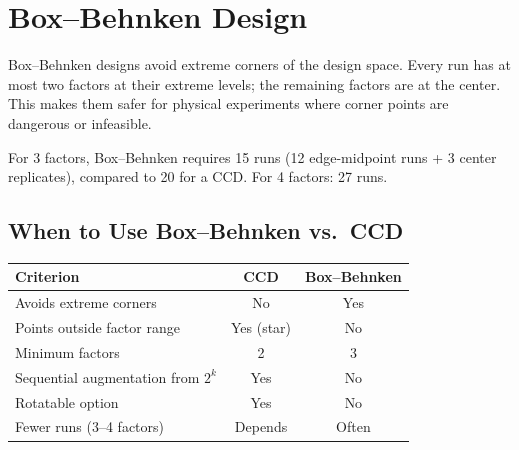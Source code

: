 \documentclass[11pt]{book}
\begin{document}
\section{Box--Behnken Design}

\begin{keypoint}
Box--Behnken designs avoid extreme corners of the design space. Every run has
at most two factors at their extreme levels; the remaining factors are at the
center. This makes them safer for physical experiments where corner points are
dangerous or infeasible.
\end{keypoint}

\begin{center}
\end{center}

For 3 factors, Box--Behnken requires 15 runs (12 edge-midpoint runs + 3 center
replicates), compared to 20 for a CCD. For 4 factors: 27 runs.

\subsection{When to Use Box--Behnken vs.\ CCD}

\begin{center}
\begin{tabular}{lcc}
\toprule
Criterion & CCD & Box--Behnken \\
\midrule
Avoids extreme corners & No & Yes \\
Points outside factor range & Yes (star) & No \\
Minimum factors & 2 & 3 \\
Sequential augmentation from $2^k$ & Yes & No \\
Rotatable option & Yes & No \\
Fewer runs (3--4 factors) & Depends & Often \\
\bottomrule
\end{tabular}
\end{center}
\end{document}
